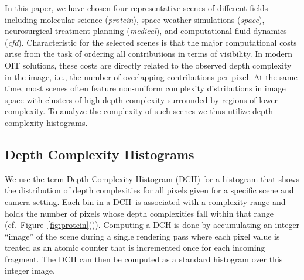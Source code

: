 \documentclass{egpubl}
\newcommand{\dch}{DCH}
\begin{document}
In this paper, we have chosen four representative scenes of different fields including molecular science (\emph{protein}), space weather simulations (\emph{space}), neurosurgical treatment planning (\emph{medical}), and computational fluid dynamics (\emph{cfd}). 
Characteristic for the selected scenes is that the major computational costs arise from the task of ordering all contributions in terms of visibility. 
In modern OIT solutions, these costs are directly related to the observed depth complexity in the image, i.e., the number of overlapping contributions per pixel. 
%
At the same time, most scenes often feature non-uniform complexity distributions in image space with clusters of high depth complexity surrounded by regions of lower complexity. 
To analyze the complexity of such scenes we thus utilize depth complexity histograms.


\subsection{Depth Complexity Histograms}
\label{sec:dch}
   
We use the term Depth Complexity Histogram (\dch) for a histogram that shows the distribution of depth complexities for all pixels given for a specific scene and camera setting. 
Each bin in a \dch\ is associated with a complexity range and holds the number of pixels whose depth complexities fall within that range (cf.\ Figure~\ref{fig:protein}()). 
Computing a \dch{} is done by accumulating an integer ``image'' of the scene during a single rendering pass where each pixel value is treated as an atomic counter that is incremented once for each incoming fragment.
The \dch{} can then be computed as a standard histogram over this integer image.
\end{document}
